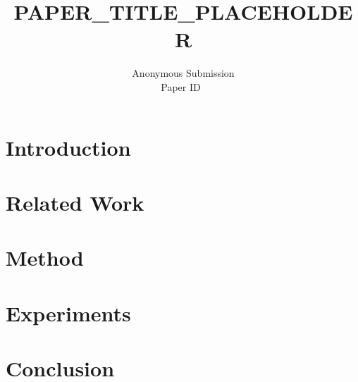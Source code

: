 \documentclass[10pt,twocolumn,letterpaper]{article}
\title{PAPER\_TITLE\_PLACEHOLDER}
\author{Anonymous Submission\\
Paper ID~\paperID
}
\begin{document}
\maketitle

%

\begin{abstract}

\end{abstract}

\section{Introduction}
\label{sec:intro}


\section{Related Work}
\label{sec:related}


\section{Method}
\label{sec:method}


\section{Experiments}
\label{sec:experiments}


\section{Conclusion}
\label{sec:conclusion}


{
    \small
    
    
}
\end{document}

